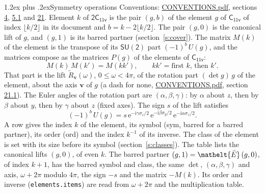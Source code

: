 \documentclass[10pt,a4paper]{article}
\makeatletter
\renewcommand\section{\@startsection{section}{1}{\z@}{-3ex plus -1ex minus -.2ex}%
  {1.2ex plus .2ex}{\normalfont\large\sffamily\bfseries\color{parttitle}}}
\numberwithin{equation}{section}
\newcommand{\eltfont}[1]{{\let\sigma\eltsigma\mathelt{#1}}}
\newcommand{\grp}[1]{\mathsf{#1}}
\newcommand{\elt}[1]{\eltfont{#1}}
\newcommand{\vv}{\mathbf{v}}
\newcommand{\iunit}{\mathrm{i}}
\newcommand{\expe}{\mathrm{e}}
\newcommand{\barred}[1]{\bar{#1}}
\newcommand{\lift}[1]{\tilde{#1}}
\newcommand{\pauli}[1]{\sigma_{#1}}
\makeatother
\begin{document}
\section{Symmetry operations}\label{s:elements}
Conventions: \href{../../CONVENTIONS.pdf}{CONVENTIONS.pdf}, sections \href{../../../rotation/CONVENTIONS.pdf\#conv.4}{4}, \href{../../../rotation/CONVENTIONS.pdf\#conv.5.1}{5.1} and \href{../../CONVENTIONS.pdf\#conv.21}{21}.
\leavevmode\label{n:index.element}\label{n:element.g}Element $k$ of $\grp{2C_{11v}}$ is the pair $(g, b)$ of the element $g$ of \href{../../../rotation/data/pdf/C11v.pdf}{$\grp{C_{11v}}$} of index $\lfloor k/2\rfloor$ in its document and $b = k - 2\lfloor k/2\rfloor$. The pair $(g, 0)$ is the canonical lift of $g$, and $(g, 1)$ is its barred partner (section~\ref{s:cover}). \label{n:matrix.element.pin}\label{n:matrix.element}The matrix $M(k)$ of the element is the transpose of its $\grp{SU(2)}$ part $(-1)^{b}\,U(g)$, and the matrices compose as the matrices $P(g)$ of the elements of $\grp{C_{11v}}$:
\begin{equation}\label{e:mprod}M(k)\,M(k') = M(kk'),\qquad kk' = \text{first } k\text{, then } k'.\end{equation}
\leavevmode\label{n:angle.omega}\label{n:vector.axis}\label{n:vector.pole}That part is the lift $\lift{R}_{\vv}(\omega)$, $0 \le \omega < 4\pi$, of the rotation part $(\det g)\,g$ of the element, about the axis $\vv$ of $g$ (a dash for none, \href{../../CONVENTIONS.pdf}{CONVENTIONS.pdf}, section \href{../../CONVENTIONS.pdf\#conv.21.1}{21.1}). \label{n:angle.euler.alpha}\label{n:angle.euler.beta}\label{n:angle.euler.gamma}\label{n:vector.coordinates}The Euler angles of the rotation part are $(\alpha,\beta,\gamma)$: by $\alpha$ about $z$, then by $\beta$ about $y$, then by $\gamma$ about $z$ (fixed axes). \label{n:local.euler.sign}The sign $s$ of the lift satisfies
\begin{equation}\label{e:euler}(-1)^{b}\,U(g) = s\,\expe^{-\iunit\gamma\pauli{z}/2}\,\expe^{-\iunit\beta\pauli{y}/2}\,\expe^{-\iunit\alpha\pauli{z}/2}.\end{equation}
\leavevmode\label{n:index.element.inverse}\label{n:head.sym}\label{n:head.ord}A row gives the index $k$ of the element, its symbol (sym, barred for a barred partner), its order (ord) and the index $k^{-1}$ of its inverse. \label{n:head.class}The class of the element is set with its size before its symbol (section~\ref{s:classes}).
The table lists the canonical lifts $(g, 0)$, of even $k$. The barred partner $(g, 1) = \elt{\barred{E}}\,(g, 0)$, of index $k + 1$, has the barred symbol and class, the same $\det$, $(\alpha,\beta,\gamma)$ and axis, $\omega + 2\pi$ modulo $4\pi$, the sign $-s$ and the matrix $-M(k)$. Its order and inverse (\texttt{elements.items}) are read from $\omega + 2\pi$ and the multiplication table.
\end{document}
